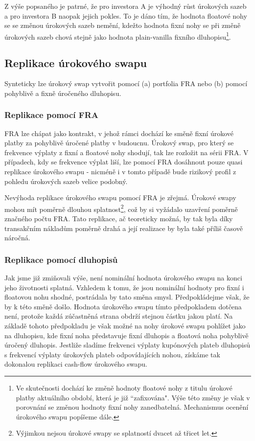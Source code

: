 \documentclass[a4paper]{book}
\begin{document}
Z výše popsaného je patrné, že pro investora A je výhodný růst úrokových sazeb a pro investora B naopak jejich pokles. To je dáno tím, že hodnota floatové nohy se se změnou úrokových sazeb nemění, kdežto hodnota fixní nohy se při změně úrokových sazeb chová stejně jako hodnota plain-vanilla fixního dluhopisu\footnote{Ve skutečnosti dochází ke změně hodnoty floatové nohy z titulu úrokové platby aktuálního období, která je již ``zafixována". Výše této změny je však v porovnání se změnou hodnoty fixní nohy zanedbatelná. Mechanismus ocenění úrokového swapu popíšeme dále.}.

\subsection{Replikace úrokového swapu}

Synteticky lze úrokový swap vytvořit pomocí (a) portfolia FRA nebo (b) pomocí pohyblivě a fixně úročeného dluhopisu.

\subsubsection{Replikace pomocí FRA}

FRA lze chápat jako kontrakt, v jehož rámci dochází ke směně fixní úrokové platby za pohyblivě úročené platby v budoucnu. Úrokový swap, pro který se frekvence výplaty z fixní a floatové nohy shodují, tak lze rozložit na sérii FRA. V případech, kdy se frekvence výplat liší, lze pomocí FRA dosáhnout pouze quasi replikace úrokového swapu - nicméně i v tomto případě bude rizikový profil z pohledu úrokových sazeb velice podobný.

Nevýhoda replikace úrokového swapu pomocí FRA je zřejmá. Úrokové swapy mohou mít poměrně dlouhou splatnost\footnote{Výjimkou nejsou úrokové swapy se splatností dvacet až třicet let.}, což by si vyžádalo uzavření poměrně značného počtu FRA. Tato replikace, ač teoreticky možná, by tak byla díky transakčním nákladům poměrně drahá a její realizace by byla také příliš časově náročná.

\subsubsection{Replikace pomocí dluhopisů}

Jak jsme již zmiňovali výše, není nominální hodnota úrokového swapu na konci jeho životnosti splatná. Vzhledem k tomu, že jsou nominální hodnoty pro fixní i floatovou nohu shodné, postrádala by tato směna smysl. Předpokládejme však, že by k této směně došlo. Hodnota úrokového swapu tímto předpokladem dotčena není, protože každá zúčastněná strana obdrží stejnou částku jakou platí. Na základě tohoto předpokladu je však možné na nohy úrokové swapu pohlížet jako na dluhopisu, kde fixní noha představuje fixní dluhopis a floatová noha pohyblivě úročený dluhopis. Jestliže sladíme frekvenci výplaty kupónových plateb dluhopisů s frekvencí výplaty úrokových plateb odpovídajících nohou, získáme tak dokonalou replikaci cash-flow úrokového swapu.
\end{document}
